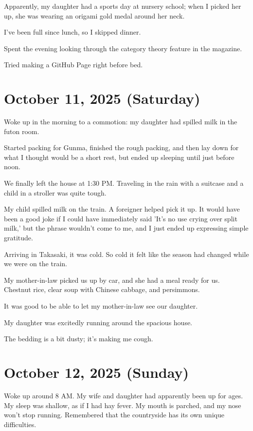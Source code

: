 \documentclass{article}
\begin{document}
Apparently, my daughter had a sports day at nursery school; when I picked her up, she was wearing an origami gold medal around her neck.

I've been full since lunch, so I skipped dinner.

Spent the evening looking through the category theory feature in the magazine.

Tried making a GitHub Page right before bed.

\section{October 11, 2025 (Saturday)}

Woke up in the morning to a commotion: my daughter had spilled milk in the futon room.

Started packing for Gunma, finished the rough packing, and then lay down for what I thought would be a short rest, but ended up sleeping until just before noon.

We finally left the house at 1:30 PM.
Traveling in the rain with a suitcase and a child in a stroller was quite tough.

My child spilled milk on the train. A foreigner helped pick it up.
It would have been a good joke if I could have immediately said 'It's no use crying over split milk,' but the phrase wouldn't come to me, and I just ended up expressing simple gratitude.

Arriving in Takasaki, it was cold.
So cold it felt like the season had changed while we were on the train.

My mother-in-law picked us up by car, and she had a meal ready for us.
Chestnut rice, clear soup with Chinese cabbage, and persimmons.

It was good to be able to let my mother-in-law see our daughter.

My daughter was excitedly running around the spacious house.

The bedding is a bit dusty; it's making me cough.

\section{October 12, 2025 (Sunday)}

Woke up around 8 AM.
My wife and daughter had apparently been up for ages.
My sleep was shallow, as if I had hay fever. My mouth is parched, and my nose won't stop running.
Remembered that the countryside has its own unique difficulties.
\end{document}
